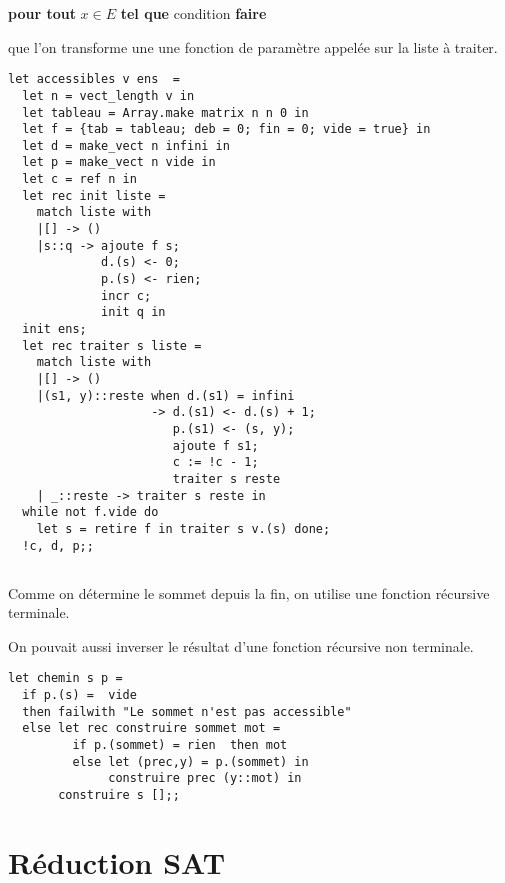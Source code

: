 {\bf pour tout} $x\in E$ {\bf tel que} condition {\bf faire}

que l'on transforme une une fonction de paramètre  appelée sur la liste à traiter.
\newpage

\begin{lstlisting}
let accessibles v ens  =
  let n = vect_length v in
  let tableau = Array.make matrix n n 0 in
  let f = {tab = tableau; deb = 0; fin = 0; vide = true} in
  let d = make_vect n infini in
  let p = make_vect n vide in
  let c = ref n in
  let rec init liste = 
    match liste with
    |[] -> ()
    |s::q -> ajoute f s;
             d.(s) <- 0;
             p.(s) <- rien;
             incr c;
             init q in
  init ens;
  let rec traiter s liste =
    match liste with
    |[] -> ()
    |(s1, y)::reste when d.(s1) = infini
                    -> d.(s1) <- d.(s) + 1;
                       p.(s1) <- (s, y);
                       ajoute f s1;
                       c := !c - 1;
                       traiter s reste
    | _::reste -> traiter s reste in 
  while not f.vide do
    let s = retire f in traiter s v.(s) done;
  !c, d, p;;
\end{lstlisting}
\subsection{}
Comme on détermine le sommet depuis la fin, on utilise une fonction récursive terminale. 

On pouvait aussi inverser le résultat d'une fonction récursive non terminale.
\begin{lstlisting}
let chemin s p =
  if p.(s) =  vide
  then failwith "Le sommet n'est pas accessible"
  else let rec construire sommet mot =
         if p.(sommet) = rien  then mot
         else let (prec,y) = p.(sommet) in
              construire prec (y::mot) in
       construire s [];;

\end{lstlisting}
\section{Réduction SAT}
